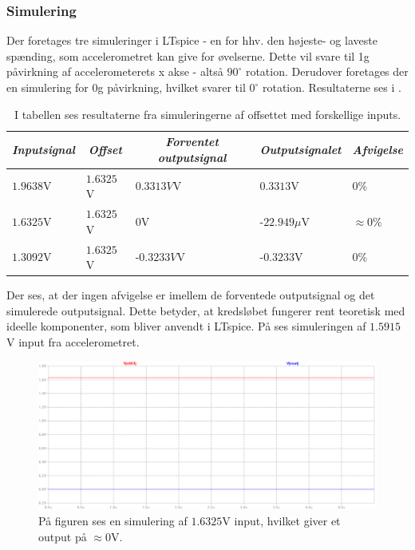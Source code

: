 \subsubsection{Simulering}
Der foretages tre simuleringer i LTspice - en for hhv. den højeste- og laveste spænding, som accelerometret kan give for øvelserne. Dette vil svare til 1g påvirkning af accelerometerets x akse - altså $90^{\circ}$ rotation. Derudover foretages der en simulering for 0g påvirkning, hvilket svarer til $0^{\circ}$ rotation. Resultaterne ses i .
\begin{table}[H]
	\centering
	\begin{tabular}{|l|l|l|l|l|}
		\hline
		\multicolumn{1}{|c|}{\textit{Inputsignal}} & \multicolumn{1}{c|}{\textit{Offset}} & \multicolumn{1}{c|}{\textit{Forventet outputsignal}} & \multicolumn{1}{c|}{\textit{Outputsignalet}} & \multicolumn{1}{c|}{\textit{Afvigelse}} \\ \hline
		$1.9638$V     & $1.6325$V    & $0.3313V$V    & $0.3313$V       & $0$\%              \\ \hline
		$1.6325$V     & $1.6325$V    & $0$V          & -$22.949\mu$V   & $\approx 0$\%      \\ \hline
		$1.3092$V     & $1.6325$V    & -$0.3233V$V   & -$0.3233$V      & $0$\%                \\ \hline
	\end{tabular}
	\caption{I tabellen ses resultaterne fra simuleringerne af offsettet med forskellige inputs.}
	\label{Tab:offset_sim}
\end{table}
\noindent Der ses, at der ingen afvigelse er imellem de forventede outputsignal og det simulerede outputsignal. Dette betyder, at kredsløbet fungerer rent teoretisk med ideelle komponenter, som bliver anvendt i LTspice. På  ses simuleringen af $1.5915$V input fra accelerometret.
 
\begin{figure}[H]
\centering
\includegraphics[scale=0.3]{figures/cProblemloesning/Offset_simulering.png}
\caption{På figuren ses en simulering af $1.6325$V input, hvilket giver et output på $\approx 0$V.}
\label{fig:Offset_simulering}
\end{figure}

